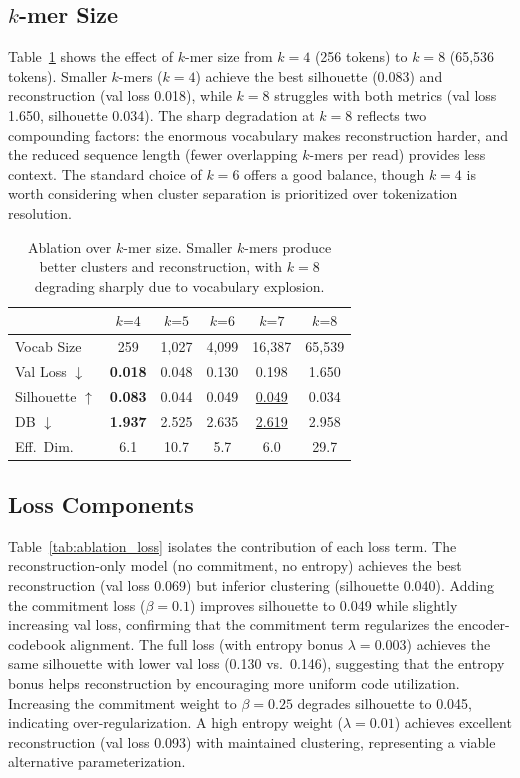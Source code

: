 \documentclass[pmlr]{jmlr}%
\newcommand{\best}[1]{\textbf{#1}}
\newcommand{\second}[1]{\underline{#1}}
\begin{document}
\subsection{$k$-mer Size}

Table~\ref{tab:ablation_kmer} shows the effect of $k$-mer size from $k = 4$ (256 tokens) to $k = 8$ (65,536 tokens). Smaller $k$-mers ($k = 4$) achieve the best silhouette (0.083) and reconstruction (val loss 0.018), while $k = 8$ struggles with both metrics (val loss 1.650, silhouette 0.034). The sharp degradation at $k = 8$ reflects two compounding factors: the enormous vocabulary makes reconstruction harder, and the reduced sequence length (fewer overlapping $k$-mers per read) provides less context. The standard choice of $k = 6$ offers a good balance, though $k = 4$ is worth considering when cluster separation is prioritized over tokenization resolution.

\begin{table}[t]
  \centering
  \caption{Ablation over $k$-mer size. Smaller $k$-mers produce better clusters and reconstruction, with $k{=}8$ degrading sharply due to vocabulary explosion.}
  \label{tab:ablation_kmer}
  \small
  \begin{tabular}{lccccc}
  \toprule
  & $k\text{=}4$ & $k\text{=}5$ & $k\text{=}6$ & $k\text{=}7$ & $k\text{=}8$ \\
  \midrule
  Vocab Size & 259 & 1,027 & 4,099 & 16,387 & 65,539 \\
  Val Loss $\downarrow$ & \best{0.018} & 0.048 & 0.130 & 0.198 & 1.650 \\
  Silhouette $\uparrow$ & \best{0.083} & 0.044 & 0.049 & \second{0.049} & 0.034 \\
  DB $\downarrow$ & \best{1.937} & 2.525 & 2.635 & \second{2.619} & 2.958 \\
  Eff.\ Dim. & 6.1 & 10.7 & 5.7 & 6.0 & 29.7 \\
  \bottomrule
  \end{tabular}
\end{table}

\subsection{Loss Components}

Table~\ref{tab:ablation_loss} isolates the contribution of each loss term. The reconstruction-only model (no commitment, no entropy) achieves the best reconstruction (val loss 0.069) but inferior clustering (silhouette 0.040). Adding the commitment loss ($\beta = 0.1$) improves silhouette to 0.049 while slightly increasing val loss, confirming that the commitment term regularizes the encoder-codebook alignment. The full loss (with entropy bonus $\lambda = 0.003$) achieves the same silhouette with lower val loss (0.130 vs.\ 0.146), suggesting that the entropy bonus helps reconstruction by encouraging more uniform code utilization. Increasing the commitment weight to $\beta = 0.25$ degrades silhouette to 0.045, indicating over-regularization. A high entropy weight ($\lambda = 0.01$) achieves excellent reconstruction (val loss 0.093) with maintained clustering, representing a viable alternative parameterization.
\end{document}
